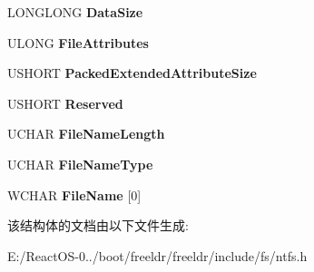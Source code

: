 \begin{DoxyCompactItemize}
L\+O\+N\+G\+L\+O\+NG {\bfseries Data\+Size}
\item 
\mbox{\label{struct_n_t_f_s___f_i_l_e___n_a_m_e___a_t_t_r_a6ab28e1d68958b1df079b262777b0368}} 
U\+L\+O\+NG {\bfseries File\+Attributes}
\item 
\mbox{\label{struct_n_t_f_s___f_i_l_e___n_a_m_e___a_t_t_r_a8bd854d49931d16f755475d8d58b3d73}} 
U\+S\+H\+O\+RT {\bfseries Packed\+Extended\+Attribute\+Size}
\item 
\mbox{\label{struct_n_t_f_s___f_i_l_e___n_a_m_e___a_t_t_r_a89a28cf56d447a8a892c0abd000823db}} 
U\+S\+H\+O\+RT {\bfseries Reserved}
\item 
\mbox{\label{struct_n_t_f_s___f_i_l_e___n_a_m_e___a_t_t_r_a356b4a1e26d9a822c316020d073b9271}} 
U\+C\+H\+AR {\bfseries File\+Name\+Length}
\item 
\mbox{\label{struct_n_t_f_s___f_i_l_e___n_a_m_e___a_t_t_r_ac6e89feed2e7cec7fbb7aef3bd2d1cee}} 
U\+C\+H\+AR {\bfseries File\+Name\+Type}
\item 
\mbox{\label{struct_n_t_f_s___f_i_l_e___n_a_m_e___a_t_t_r_a21924a2aba28f9a7e2feb795917257e9}} 
W\+C\+H\+AR {\bfseries File\+Name} \mbox{[}0\mbox{]}
\end{DoxyCompactItemize}


该结构体的文档由以下文件生成\+:\begin{DoxyCompactItemize}
\item 
E\+:/\+React\+O\+S-\/0../boot/freeldr/freeldr/include/fs/ntfs.\+h\end{DoxyCompactItemize}
